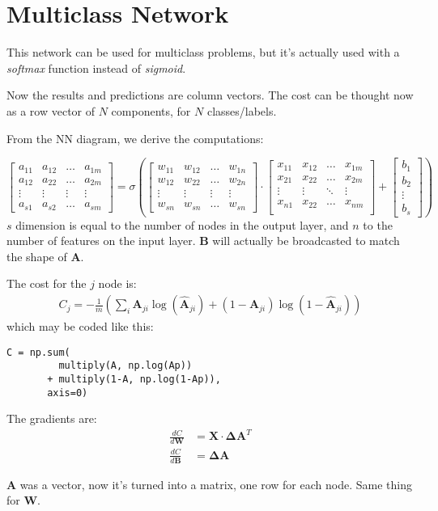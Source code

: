 \section{Multiclass Network}

This network can be used for multiclass problems, but it's actually used with a \textit{softmax} function instead of \textit{sigmoid}. 

Now the results and predictions are column vectors. The cost can be thought now as a row vector of $N$ components, for $N$ classes/labels.

From the NN diagram, we derive the computations:

\begin{equation*}
  \begin{bmatrix}
    a_{11} & a_{12}& \ldots& a_{1m}\\ 
    a_{12} & a_{22}& \ldots& a_{2m}\\ 
    \vdots & \vdots & \vdots& \vdots\\ 
    a_{s1} & a_{s2}& \ldots& a_{sm} 
  \end{bmatrix}
    =\sigma( 
  \begin{bmatrix}
    w_{11} & w_{12}& \ldots& w_{1n}\\ 
    w_{12} & w_{22}& \ldots& w_{2n}\\ 
    \vdots & \vdots & \vdots& \vdots\\ 
    w_{sn} & w_{sn}& \ldots& w_{sn} 
  \end{bmatrix}
  \cdot{}
  \begin{bmatrix}
    x_{11} & x_{12} & \ldots & x_{1m}\\
    x_{21} & x_{22} & \ldots & x_{2m}\\
    \vdots & \vdots & \ddots & \vdots\\
    x_{n1} & x_{22} & \ldots & x_{nm}\\
  \end{bmatrix}
  +
  \begin{bmatrix}
    b_1\\ b_2\\ \vdots\\ b_s
  \end{bmatrix})
\end{equation*}
$s$ dimension is equal to the number of nodes in the output layer, and $n$ to the number of features on the input layer. $\mathbf{B}$ will actually be broadcasted to match the shape of $\mathbf{A}$. 

The cost for the $j$ node is:
\begin{align}
  C_j = -\frac{1}{m}\left(\sum_i \mathbf{A}_{ji}\log(\hat{\mathbf{A}}_{ji}) + (1-\mathbf{A}_{ji})\log(1-\hat{\mathbf{A}}_{ji})\right) 
\end{align}
which may be coded like this:
\begin{verbatim}
C = np.sum(
         multiply(A, np.log(Ap))
       + multiply(1-A, np.log(1-Ap)),
       axis=0)
\end{verbatim}
The gradients are: 
\begin{align}
  \frac{dC}{d\mathbf{W}} &= \mathbf{X}\cdot{}\mathbf{\Delta A}^T\\
  \frac{dC}{d\mathbf{B}} &= \mathbf{\Delta A}
\end{align}

$\mathbf{A}$ was a vector, now it's turned into a matrix, one row for each node. Same thing for $\mathbf{W}$.
